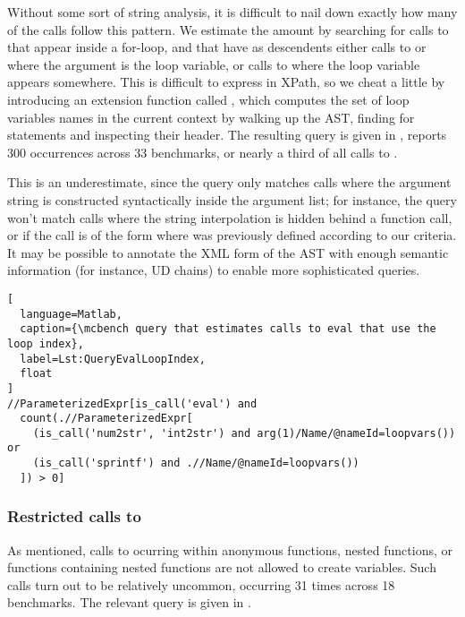 Without some sort of string analysis, it is difficult to nail down exactly how
many of the calls follow this pattern. We estimate the amount by searching for
calls to  that appear inside a for-loop, and that have as
descendents either calls to  or  where the argument
is the loop variable, or calls to  where the loop variable
appears somewhere. This is difficult to express in XPath, so we cheat a little
by introducing an extension function called , which computes
the set of loop variables names in the current context by walking up the AST,
finding for statements and inspecting their header. The resulting query is
given in , reports 300 occurrences across 33
benchmarks, or nearly a third of all calls to .

This is an underestimate, since the query only matches calls where the argument
string is constructed syntactically inside the argument list; for instance, the
query won't match calls where the string interpolation is hidden behind a
function call, or if the call is of the form  where  was
previously defined according to our criteria. It may be possible to annotate
the XML form of the AST with enough semantic information (for instance, UD
chains) to enable more sophisticated queries.


\begin{lstlisting}[
  language=Matlab,
  caption={\mcbench query that estimates calls to eval that use the loop index},
  label=Lst:QueryEvalLoopIndex,
  float
]
//ParameterizedExpr[is_call('eval') and
  count(.//ParameterizedExpr[
    (is_call('num2str', 'int2str') and arg(1)/Name/@nameId=loopvars()) or
    (is_call('sprintf') and .//Name/@nameId=loopvars())
  ]) > 0]
\end{lstlisting}

\subsubsection{Restricted calls to }

As mentioned, calls to  ocurring within anonymous functions, nested
functions, or functions containing nested functions are not allowed to create
variables. Such calls turn out to be relatively uncommon, occurring 31 times
across 18 benchmarks. The relevant query is given in
.

